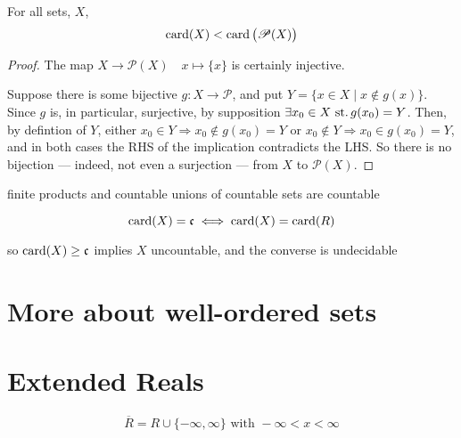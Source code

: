 \begin{prop}\label{prop:0.9}
  For all sets, $X$,
  \[ \operatorname{card}(X) < \operatorname{card}\big(\mathscr{P}(X)\big) \]
\end{prop}
\begin{proof}
  The map
  ${X \rightarrow \mathscr{P}(X) \quad x\mapsto \{x\}}$
  is certainly injective.

  Suppose there is some bijective ${g: X \rightarrow \mathscr{P}}$,
  and put ${Y=\{x\in X\mid x\notin g(x)\}}$.
  Since $g$ is, in particular, surjective, by supposition
  ${\exists x_0\in X \operatorname{\,st.} g(x_0)=Y}$.  Then, by defintion of $Y$,
  either ${x_0\in Y \Rightarrow x_0\notin g(x_0)=Y}$
  or ${x_0\notin Y \Rightarrow x_0\in g(x_0)=Y}$,
  and in both cases the RHS of the implication contradicts the LHS.
  So there is no bijection --- indeed, not even a surjection ---
  from $X$ to ${\mathscr{P}(X)}$.
\end{proof}

\begin{prop}\label{prop:0.10}
  finite products and countable unions of countable sets are countable
\end{prop}

\begin{defn}
  \[\operatorname{card}(X) = \mathfrak{c} \iff \operatorname{card}(X) = \operatorname{card}(R) \]
\end{defn}

so ${\operatorname{card}(X)\geq\mathfrak{c}}$ implies $X$ uncountable,
and the converse is undecidable


\section{More about well-ordered sets}

\section{Extended Reals}
\[ \overline R = R \cup \{-\infty, \infty\}
\text{ with } -\infty < x < \infty \]


